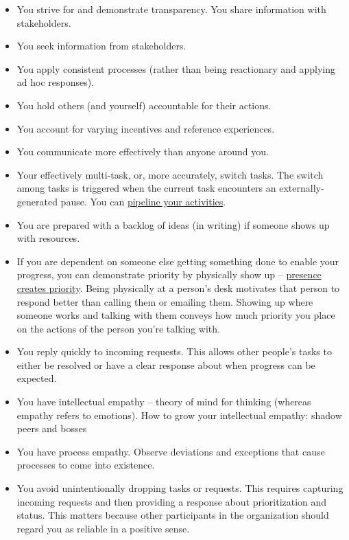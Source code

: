 \begin{itemize}
\item You strive for and demonstrate transparency. You share information with stakeholders.
\item You seek information from stakeholders.
\item You apply consistent processes (rather than being reactionary and applying ad hoc responses).
\item You hold others (and yourself) accountable for their actions.
\item You account for varying incentives and reference experiences.
    \item You communicate more effectively than anyone around you.
    \item Your effectively multi-task, or, more accurately, switch tasks. The switch among tasks is triggered when the current task encounters an externally-generated pause. You can \href{https://en.wikipedia.org/wiki/Pipeline_(computing)#Concept_and_motivation}{pipeline your activities}.
    \item You are prepared with a backlog of ideas (in writing) if someone shows up with resources.
    \item If you are dependent on someone else getting something done to enable your progress, you can demonstrate priority by physically show up -- \underline{presence creates priority}. Being physically at a person's desk motivates that person to respond better than calling them or emailing them. Showing up where someone works and talking with them conveys how much priority you place on the actions of the person you're talking with.
    \item You reply quickly to incoming requests. This allows other people's tasks to either be resolved or have a clear response about when progress can be expected. 
    \item You have intellectual empathy -- theory of mind for thinking (whereas empathy refers to emotions). How to grow your intellectual empathy: shadow peers and bosses
    \item You have process empathy. Observe deviations and exceptions that cause processes to come into existence. 
    \item You avoid unintentionally dropping tasks or requests. This requires capturing incoming requests and then providing a response about prioritization and status. This matters because other participants in the organization should regard you as reliable in a positive sense. 

\end{itemize}

